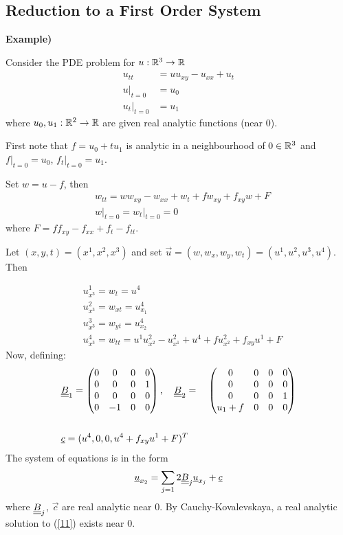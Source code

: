 \documentclass[12pt,a4paper]{report}
\newenvironment{proof}
{\begin{changemargin}{1cm}{0.5cm} 
	}%
	{\end{changemargin}
}
\begin{document}
\subsection*{Reduction to a First Order System}

\textbf{Example) }
\begin{proof}
\quad Consider the PDE problem for $u:\mathbb{R}^3 \rightarrow \mathbb{R}$
\begin{align}
u_{tt} &= uu_{xy} - u_{xx} + u_t  \label{11} \\
u\big|_{t=0}  &= u_0  \nonumber \\
u_t \big|_{t=0} &= u_1 \nonumber
\end{align}
where $u_0, u_1:\mathbb{R}^2 \rightarrow \mathbb{R}$ are given real analytic functions (near 0).

First note that $f=u_0 + tu_1$ is analytic in a neighbourhood of $0\in \mathbb{R}^3$ and $f\big|_{t=0} = u_0$, $f_t\big|_{t=0} = u_1$. 

Set $w = u-f$, then
\begin{align*}
& w_{tt} = ww_{xy}  - w_{xx} + w_t + fw_{xy} + f_{xy} w + F\\
& w\big|_{t=0} = w_t \big|_{t=0} =0
\end{align*}
where $F= ff_{xy} - f_{xx} +f_t -f_{tt}$.

Let $(x,y,t) = (x^1,x^2,x^3)$ and set $\vec{u} = (w,w_x,w_y,w_t) = (u^1,u^2,u^3,u^4)$. Then

\begin{align*}
& u^1_{x^3} = w_t = u^4 \\
& u^2_{x^3} = w_{xt} = u^4_{x_1} \\
& u^3_{x^3} = w_{yt} = u^4_{x_2} \\
& u^4_{x^3} = w_{tt} = u^1 u^2_{x^2} - u^2_{x^1}+ u^4+ fu^2_{x^2} + f_{xy}u^1 + F
\end{align*}
Now, defining:
\begin{align*}
& \underline{\underline{B}}_1 = \begin{pmatrix}
0 & 0 & 0 & 0 \\
0 & 0 & 0 & 1 \\
0 & 0 & 0 & 0 \\
0 & -1& 0 & 0
\end{pmatrix},\quad \underline{\underline{B}}_2 = \quad \begin{pmatrix}
0 & 0 & 0 & 0 \\
0 & 0 & 0 & 0 \\
0 & 0 & 0 & 1 \\
u_1 +f & 0 & 0 & 0 
\end{pmatrix} \\
& \quad \\
& \underline{c} = (u^4, 0, 0, u^4 + f_{xy}u^1 +F)^T
\end{align*}
The system of equations is in the form
\begin{align*}
\underline{u}_{x_2} = \sum_{j=1}2 \underline{\underline{B}}_j \underline{u}_{x_j} + \underline{c}
\end{align*}
where $\underline{\underline{B}}_j$, $\vec{c}$ are real analytic near 0. By Cauchy-Kovalevskaya, a real analytic solution to (\ref{11}) exists near 0.
\end{proof}
\s
\end{document}

